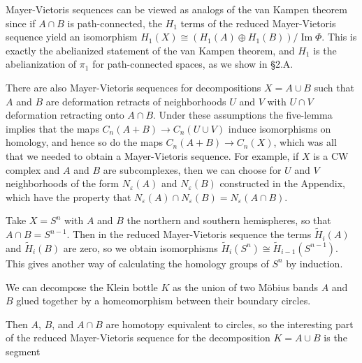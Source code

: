 Mayer-Vietoris sequences can be viewed as analogs of the van Kampen theorem since if $A \cap B$ is path-connected, the $H_1$ terms of the reduced Mayer-Vietoris sequence yield an isomorphism $H_1(X) \cong (H_1(A) \oplus H_1(B)) / \operatorname{Im} \Phi$. This is exactly the abelianized statement of the van Kampen theorem, and $H_1$ is the abelianization of $\pi_1$ for path-connected spaces, as we show in \S 2.A.

There are also Mayer-Vietoris sequences for decompositions $X = A \cup B$ such that $A$ and $B$ are deformation retracts of neighborhoods $U$ and $V$ with $U \cap V$ deformation retracting onto $A \cap B$. Under these assumptions the five-lemma implies that the maps $C_n(A + B) \to C_n(U \cup V)$ induce isomorphisms on homology, and hence so do the maps $C_n(A + B) \to C_n(X)$, which was all that we needed to obtain a Mayer-Vietoris sequence. For example, if $X$ is a CW complex and $A$ and $B$ are subcomplexes, then we can choose for $U$ and $V$ neighborhoods of the form $N_\varepsilon(A)$ and $N_\varepsilon(B)$ constructed in the Appendix, which have the property that $N_\varepsilon(A) \cap N_\varepsilon(B) = N_\varepsilon(A \cap B)$.

\begin{example}
\label{ex:mayer-vietoris-sphere}
Take $X = S^n$ with $A$ and $B$ the northern and southern hemispheres, so that $A \cap B = S^{n-1}$. Then in the reduced Mayer-Vietoris sequence the terms $\tilde{H}_i(A)$ and $\tilde{H}_i(B)$ are zero, so we obtain isomorphisms $\tilde{H}_i(S^n) \cong \tilde{H}_{i-1}(S^{n-1})$. This gives another way of calculating the homology groups of $S^n$ by induction.
\end{example}

\begin{example}
\label{ex:mayer-vietoris-klein-bottle}
We can decompose the Klein bottle $K$ as the union of two Möbius bands $A$ and $B$ glued together by a homeomorphism between their boundary circles.
\end{example}

Then $A$, $B$, and $A \cap B$ are homotopy equivalent to circles, so the interesting part of the reduced Mayer-Vietoris sequence for the decomposition $K = A \cup B$ is the segment

